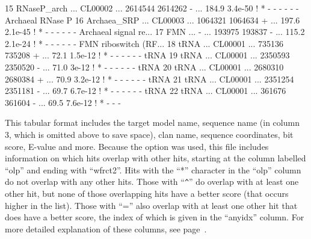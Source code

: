 \begin{tinysreoutput}
15   RNaseP_arch            ... CL00002   ...  2614544  2614262      - ...  184.9   3.4e-50  !   *       -      -      -      -      -      - Archaeal RNase P
16   Archaea_SRP            ... CL00003   ...  1064321  1064634      + ...  197.6   2.1e-45  !   *       -      -      -      -      -      - Archaeal signal re...
17   FMN                    ... -         ...   193975   193837      - ...  115.2   2.1e-24  !   *       -      -      -      -      -      - FMN riboswitch (RF...
18   tRNA                   ... CL00001   ...   735136   735208      + ...   72.1   1.5e-12  !   *       -      -      -      -      -      - tRNA
19   tRNA                   ... CL00001   ...  2350593  2350520      - ...   71.0     3e-12  !   *       -      -      -      -      -      - tRNA
20   tRNA                   ... CL00001   ...  2680310  2680384      + ...   70.9   3.2e-12  !   *       -      -      -      -      -      - tRNA
21   tRNA                   ... CL00001   ...  2351254  2351181      - ...   69.7   6.7e-12  !   *       -      -      -      -      -      - tRNA
22   tRNA                   ... CL00001   ...   361676   361604      - ...   69.5   7.6e-12  !   *       -      -      -     
\end{tinysreoutput}

This tabular format includes the target model name, sequence name (in
column 3, which is omitted above to save space), clan name, sequence
coordinates, bit score, E-value and more. Because the 
option was used, this file includes information on which hits overlap
with other hits, starting at the column labelled ``olp'' and ending
with ``wfrct2''. Hits with the ``*'' character in the ``olp'' column
do not overlap with any other hits. Those with ``\verb+^+'' do overlap with
at least one other hit, but none of those overlapping hits have a
better score (that occurs higher in the list). Those with ``='' also
overlap with at least one other hit that does have a better score, the
index of which is given in the ``anyidx'' column. For more detailed
explanation of these columns, see page~\pageref{tabular-format2}.

